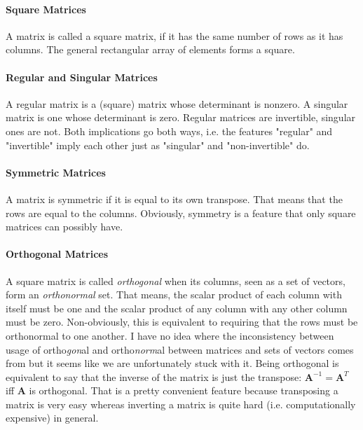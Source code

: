 


\paragraph{Square Matrices}
A matrix is called a square matrix, if it has the same number of rows as it has columns. The general rectangular array of elements forms a square.

\paragraph{Regular and Singular Matrices}
A regular matrix is a (square) matrix whose determinant is nonzero. A singular matrix is one whose determinant is zero. Regular matrices are invertible, singular ones are not. Both implications go both ways, i.e. the features "regular" and "invertible" imply each other just as "singular" and "non-invertible" do.

\paragraph{Symmetric Matrices}
A matrix is symmetric if it is equal to its own transpose. That means that the rows are equal to the columns. Obviously, symmetry is a feature that only square matrices can possibly have.

\paragraph{Orthogonal Matrices} A square matrix is called \emph{orthogonal} when its columns, seen as a set of vectors, form an \emph{orthonormal} set. That means, the scalar product of each column with itself must be one and the scalar product of any column with any other column must be zero. Non-obviously, this is equivalent to requiring that the rows must be orthonormal to one another. I have no idea where the inconsistency between usage of ortho\emph{gon}al and ortho\emph{norm}al between matrices and sets of vectors comes from but it seems like we are unfortunately stuck with it. Being orthogonal is equivalent to say that the inverse of the matrix is just the transpose: $\mathbf{A}^{-1} = \mathbf{A}^T$ iff $\mathbf{A}$ is orthogonal. That is a pretty convenient feature because transposing a matrix is very easy whereas inverting a matrix is quite hard (i.e. computationally expensive) in general.



